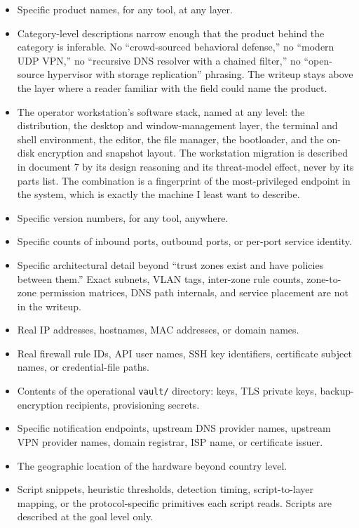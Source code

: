 \documentclass[12pt]{article}
\begin{document}
\begin{itemize}[leftmargin=18pt,itemsep=2pt]
  \item Specific product names, for any tool, at any layer.
  \item Category-level descriptions narrow enough that the product behind the category is inferable. No ``crowd-sourced behavioral defense,'' no ``modern UDP VPN,'' no ``recursive DNS resolver with a chained filter,'' no ``open-source hypervisor with storage replication'' phrasing. The writeup stays above the layer where a reader familiar with the field could name the product.
  \item The operator workstation's software stack, named at any level: the distribution, the desktop and window-management layer, the terminal and shell environment, the editor, the file manager, the bootloader, and the on-disk encryption and snapshot layout. The workstation migration is described in document 7 by its design reasoning and its threat-model effect, never by its parts list. The combination is a fingerprint of the most-privileged endpoint in the system, which is exactly the machine I least want to describe.
  \item Specific version numbers, for any tool, anywhere.
  \item Specific counts of inbound ports, outbound ports, or per-port service identity.
  \item Specific architectural detail beyond ``trust zones exist and have policies between them.'' Exact subnets, VLAN tags, inter-zone rule counts, zone-to-zone permission matrices, DNS path internals, and service placement are not in the writeup.
  \item Real IP addresses, hostnames, MAC addresses, or domain names.
  \item Real firewall rule IDs, API user names, SSH key identifiers, certificate subject names, or credential-file paths.
  \item Contents of the operational \texttt{vault/} directory: keys, TLS private keys, backup-encryption recipients, provisioning secrets.
  \item Specific notification endpoints, upstream DNS provider names, upstream VPN provider names, domain registrar, ISP name, or certificate issuer.
  \item The geographic location of the hardware beyond country level.
  \item Script snippets, heuristic thresholds, detection timing, script-to-layer mapping, or the protocol-specific primitives each script reads. Scripts are described at the goal level only.

\end{itemize}
\end{document}
